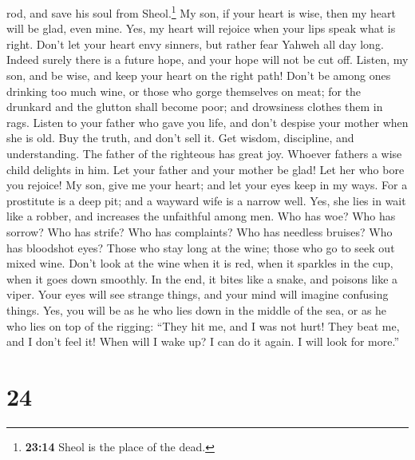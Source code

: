 rod, and save his soul from Sheol.\footnote{\textbf{23:14} Sheol is the
  place of the dead.}  My son, if your heart is wise,
then my heart will be glad, even mine.  Yes, my heart
will rejoice when your lips speak what is right.  Don't
let your heart envy sinners, but rather fear Yahweh all day long.
 Indeed surely there is a future hope, and your hope will
not be cut off.  Listen, my son, and be wise, and keep
your heart on the right path!  Don't be among ones
drinking too much wine, or those who gorge themselves on meat;
 for the drunkard and the glutton shall become poor; and
drowsiness clothes them in rags.  Listen to your father
who gave you life, and don't despise your mother when she is old.
 Buy the truth, and don't sell it. Get wisdom,
discipline, and understanding.  The father of the
righteous has great joy. Whoever fathers a wise child delights in him.
 Let your father and your mother be glad! Let her who
bore you rejoice!  My son, give me your heart; and let
your eyes keep in my ways.  For a prostitute is a deep
pit; and a wayward wife is a narrow well.  Yes, she lies
in wait like a robber, and increases the unfaithful among men.
 Who has woe? Who has sorrow? Who has strife? Who has
complaints? Who has needless bruises? Who has bloodshot eyes?
 Those who stay long at the wine; those who go to seek
out mixed wine.  Don't look at the wine when it is red,
when it sparkles in the cup, when it goes down smoothly. 
In the end, it bites like a snake, and poisons like a viper.
 Your eyes will see strange things, and your mind will
imagine confusing things.  Yes, you will be as he who
lies down in the middle of the sea, or as he who lies on top of the
rigging:  ``They hit me, and I was not hurt! They beat
me, and I don't feel it! When will I wake up? I can do it again. I will
look for more.''

\hypertarget{section-19}{%
\section{24}\label{section-19}}

